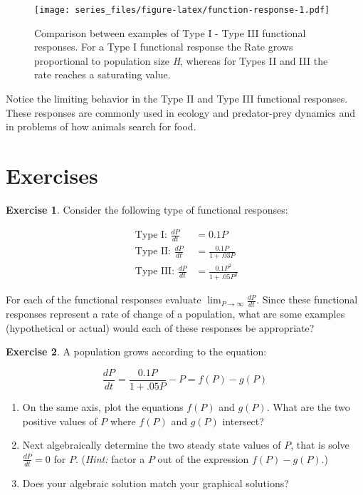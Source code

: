 \documentclass[
]{krantz}
\providecommand{\tightlist}{%
  \setlength{\itemsep}{0pt}\setlength{\parskip}{0pt}}
\theoremstyle{definition}
\theoremstyle{definition}
\theoremstyle{definition}
\newtheorem{exercise}{Exercise}[chapter]
\theoremstyle{definition}
\theoremstyle{remark}
\begin{document}
\begin{figure}
\centering
\texttt{[image: series\_files/figure-latex/function-response-1.pdf]}
\caption{\label{fig:function-response}Comparison between examples of Type I - Type III functional responses. For a Type I functional response the Rate grows proportional to population size \emph{H}, whereas for Types II and III the rate reaches a saturating value.}
\end{figure}

Notice the limiting behavior in the Type II and Type III functional responses. These responses are commonly used in ecology and predator-prey dynamics and in problems of how animals search for food.

\hypertarget{exercises}{%
\section{Exercises}\label{exercises}}

\begin{exercise}
\protect\hypertarget{exr:unnamed-chunk-3}{}{\label{exr:unnamed-chunk-3} }Consider the following type of functional responses:

\begin{equation}
\begin{split}
\mbox{ Type I: } \frac{dP}{dt} &= 0.1 P \\
\mbox{ Type II: } \frac{dP}{dt} &= \frac{0.1P}{1+.03P} \\
\mbox{ Type III: } \frac{dP}{dt} &= \frac{0.1P^{2}}{1+.05P^{2}}
\end{split}
\end{equation}

For each of the functional responses evaluate \(\displaystyle \lim_{P \rightarrow \infty} \frac{dP}{dt}\). Since these functional responses represent a rate of change of a population, what are some examples (hypothetical or actual) would each of these responses be appropriate?
\end{exercise}

\begin{exercise}
\protect\hypertarget{exr:unnamed-chunk-4}{}{\label{exr:unnamed-chunk-4} }A population grows according to the equation:

\begin{equation}
\frac{dP}{dt} = \frac{0.1P}{1+.05P} -P = f(P) - g(P)
\end{equation}

\begin{enumerate}
\def\labelenumi{\alph{enumi}.}
\tightlist
\item
  On the same axis, plot the equations \(f(P)\) and \(g(P)\). What are the two positive values of \(P\) where \(f(P)\) and \(g(P)\) intersect?
\item
  Next algebraically determine the two steady state values of \(P\), that is solve \(\displaystyle \frac{dP}{dt}=0\) for \(P\). (\emph{Hint:} factor a \(P\) out of the expression \(\displaystyle f(P)-g(P)\).)
\item
  Does your algebraic solution match your graphical solutions?
\end{enumerate}
\end{exercise}
\end{document}
